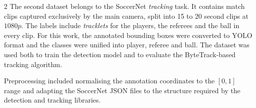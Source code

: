 \begin{multicols}{2}
The second dataset belongs to the SoccerNet \emph{tracking} task. It contains match clips captured exclusively by the main camera, split into 15 to 20 second clips at $1080p$. The labels include \emph{tracklets} for the players, the referees and the ball in every clip. For this work, the annotated bounding boxes were converted to YOLO format and the classes were unified into player, referee and ball. The dataset was used both to train the detection model and to evaluate the ByteTrack-based tracking algorithm.

Preprocessing included normalising the annotation coordinates to the \([0,1]\) range and adapting the SoccerNet JSON files to the structure required by the detection and tracking libraries.

\end{multicols}
